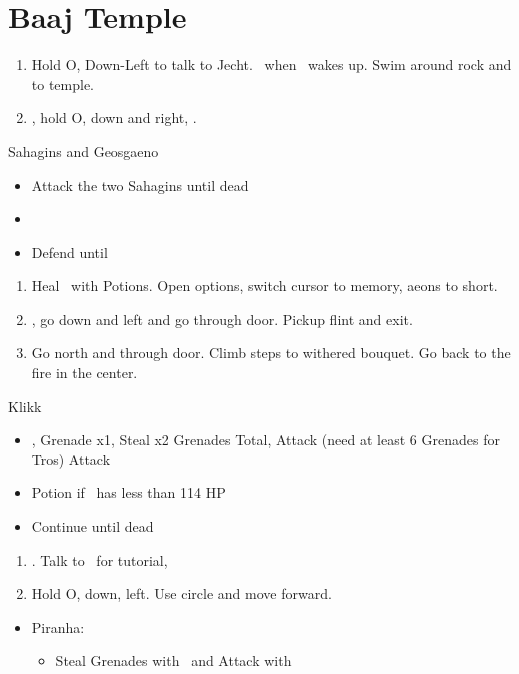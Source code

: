\chapter{Baaj Temple}

\begin{enumerate}
	\item Hold O, Down-Left to talk to Jecht. \sd\ when \tidus\ wakes up. Swim around rock and to temple.
	\item \cs, hold O, down and right, \cs.
\end{enumerate}
\begin{battle}{Sahagins and Geosgaeno}
	\begin{itemize}
		\item Attack the two Sahagins until dead
		\item \cs[0:30]
		\item Defend until \cs
	\end{itemize}
\end{battle}
\begin{enumerate}[resume]
	\item Heal \tidus\ with Potions. Open options, switch cursor to memory, aeons to short.
	\item \cs, go down and left and go through door. Pickup flint and exit.
	\item Go north and through door. Climb steps to withered bouquet. Go back to the fire in the center. \cs[2:10]
\end{enumerate}
\begin{battle}[1500]{Klikk}
	\begin{itemize}
		\tidusf Attack x6, Potion once \tidus\ has less than 227 HP
		\item \cs, \sd
		\rikkuf Grenade x1, Steal x2 Grenades Total, Attack (need at least 6 Grenades for Tros)
		\tidusf Attack
		\item Potion if \tidus\ has less than 114 HP
		\item Continue until dead
	\end{itemize}
\end{battle}
\begin{enumerate}[resume]
	\item \cs[2:30]. Talk to \rikku\ for tutorial, \sd
	\item Hold O, down, left. Use circle and move forward.
\end{enumerate}
\begin{encounters}
	\begin{itemize}
		\item Piranha:
		\begin{itemize}
			\item Steal Grenades with \rikku\ and Attack with \tidus
		\end{itemize}
	\end{itemize}
\end{encounters}
